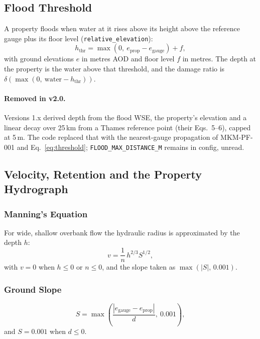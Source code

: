 \documentclass[11pt,a4paper]{article}
\begin{document}
\subsection{Flood Threshold}
\label{sec:threshold}

A property floods when water at it rises above its height above the reference gauge plus
its floor level (\texttt{relative\_elevation}):
\begin{equation}
    h_{\mathrm{thr}} = \max(0,\ e_{\mathrm{prop}} - e_{\mathrm{gauge}}) + f,
    \label{eq:threshold}
\end{equation}
with ground elevations $e$ in metres AOD and floor level $f$ in metres. The depth at the
property is the water above that threshold, and the damage ratio is
$\delta(\max(0,\ \text{water} - h_{\mathrm{thr}}))$.

\paragraph{Removed in v2.0.} Versions 1.x derived depth from the flood WSE, the property's
elevation and a linear decay over 25\,km from a Thames reference point (their
Eqs.~5--6), capped at 5\,m. The code replaced that with the nearest-gauge propagation of
MKM-PF-001 and Eq.~\eqref{eq:threshold}; \texttt{FLOOD\_MAX\_DISTANCE\_M} remains in
config, unread.

\subsection{Velocity, Retention and the Property Hydrograph}
\label{sec:velocity}

\subsubsection{Manning's Equation}
For wide, shallow overbank flow the hydraulic radius is approximated by the depth $h$:
\begin{equation}
    v = \frac{1}{n}\, h^{2/3} S^{1/2},
    \label{eq:manning}
\end{equation}
with $v=0$ when $h\le0$ or $n\le0$, and the slope taken as $\max(|S|,\,0.001)$.

\subsubsection{Ground Slope}
\begin{equation}
    S = \max\!\left(\frac{|e_{\mathrm{gauge}} - e_{\mathrm{prop}}|}{d},\ 0.001\right),
    \label{eq:slope}
\end{equation}
and $S=0.001$ when $d\le0$.
\end{document}
